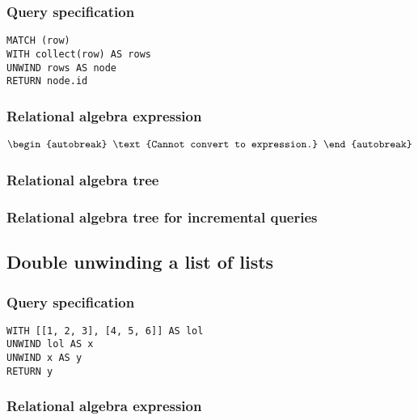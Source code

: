 \subsubsection*{Query specification}

\begin{lstlisting}
MATCH (row)
WITH collect(row) AS rows
UNWIND rows AS node
RETURN node.id
\end{lstlisting}

\subsubsection*{Relational algebra expression}

\begin{align*}
\begin{autobreak}
\text{Cannot convert to expression.}
\end{autobreak}
\end{align*}

\subsubsection*{Relational algebra tree}


\subsubsection*{Relational algebra tree for incremental queries}


\subsection{Double unwinding a list of lists}

\subsubsection*{Query specification}

\begin{lstlisting}
WITH [[1, 2, 3], [4, 5, 6]] AS lol
UNWIND lol AS x
UNWIND x AS y
RETURN y
\end{lstlisting}

\subsubsection*{Relational algebra expression}

